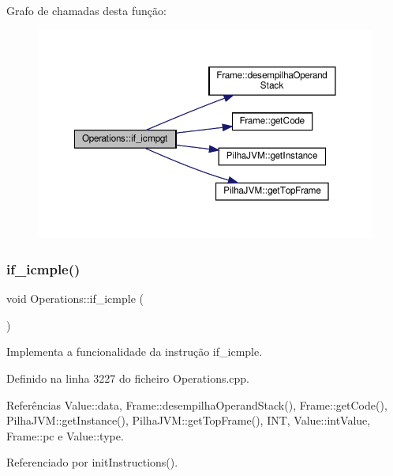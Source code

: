 Grafo de chamadas desta função\+:
\nopagebreak
\begin{figure}[H]
\begin{center}
\leavevmode
\includegraphics[width=350pt]{classOperations_a40232532d2522ef0afe261555688a7fd_cgraph}
\end{center}
\end{figure}
\mbox{\label{classOperations_a7a5736e30fcd41a1bccb71c615c4e68d}} 
\subsubsection{\texorpdfstring{if\+\_\+icmple()}{if\_icmple()}}
{\footnotesize\ttfamily void Operations\+::if\+\_\+icmple (\begin{DoxyParamCaption}{ }\end{DoxyParamCaption})\hspace{0.3cm}{\ttfamily [private]}}



Implementa a funcionalidade da instrução if\+\_\+icmple. 



Definido na linha 3227 do ficheiro Operations.\+cpp.



Referências Value\+::data, Frame\+::desempilha\+Operand\+Stack(), Frame\+::get\+Code(), Pilha\+J\+V\+M\+::get\+Instance(), Pilha\+J\+V\+M\+::get\+Top\+Frame(), I\+NT, Value\+::int\+Value, Frame\+::pc e Value\+::type.



Referenciado por init\+Instructions().

